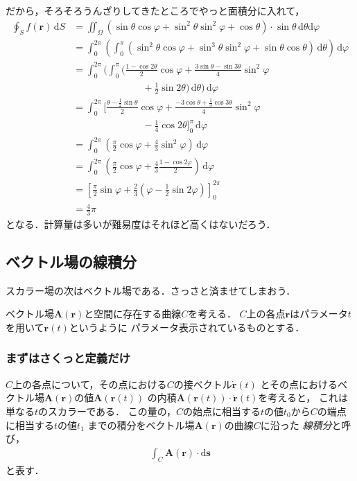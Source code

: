 だから，そろそろうんざりしてきたところでやっと面積分に入れて，
\begin{align*}
\oint_S f( \bm{r} ) \, \mathrm{d} S 
& = \iint _\Omega (\sin \theta \cos \varphi + \sin^2 \theta \sin^2  \varphi 
+ \cos \theta) \cdot \sin \theta \, \mathrm{d}\theta \mathrm{d} \varphi \\
& = \int_0^{2\pi} \left( \int_0^{\pi} ( \sin^2 \theta \cos \varphi + \sin^3 \theta \sin^2 \varphi
+ \sin \theta \cos \theta  
 ) \, \mathrm{d} \theta \right) \, \mathrm{d} \varphi \\
 & = \int_0^{2 \pi} \Biggl( \int_0^{\pi} 
 \Biggl( \frac{1-\cos 2 \theta }{2} \cos \varphi + \frac{ 3 \sin \theta - \sin 3 \theta }{4} \sin^2 \varphi \\
& \hspace{3cm} + \frac{1}{2} \sin 2 \theta \Biggr) \, \mathrm{d} \theta \Biggr) \, \mathrm{d} \varphi \\
& = \int_0^{2 \pi} \biggl[ \frac{\theta - \frac{1}{2} \sin \theta }{2} \cos \varphi 
+ \frac{ - 3 \cos \theta + \frac{1}{3} \cos 3 \theta }{4} \sin ^2 \varphi \\
& \hspace{3cm} - \frac{1}{4} \cos 2 \theta \biggr]_0^{\pi} \, \mathrm{d} \varphi \\
& = \int_0^{2 \pi} \left( \frac{\pi}{2} \cos \varphi + \frac{4}{3} \sin^2 \varphi \right) \, \mathrm{d} \varphi \\
& = \int _0^{2 \pi} \left( \frac{\pi}{2} \cos \varphi 
+ \frac{4}{3} \frac{ 1 -\cos 2 \varphi }{2} \right) \, \mathrm{d} \varphi \\
& = \left[ \frac{\pi}{2} \sin \varphi + \frac{2}{3} \left( \varphi - \frac{1}{2} \sin 2 \varphi \right)
\right] _0^{2 \pi} \\
& = \frac{4}{3}\pi
\end{align*}
となる．計算量は多いが難易度はそれほど高くはないだろう．

\subsection{ベクトル場の線積分}
スカラー場の次はベクトル場である．さっさと済ませてしまおう．

ベクトル場$\bm{A}(\bm{r})$と空間に存在する曲線$C$を考える．
$C$上の各点$\bm{r}$はパラメータ$t$を用いて$\bm{r}(t)$というように
パラメータ表示されているものとする．
\subsubsection{まずはさくっと定義だけ}
$C$上の各点について，その点における$C$の接ベクトル$\dot{ \bm{r} } (t)$
とその点におけるベクトル場$\bm{A}(\bm{r})$の値$\bm{A}(\bm{r}(t))$
の内積$\bm{A}(\bm{r}(t)) \cdot \dot{ \bm{r} } (t)$を考えると，
これは単なる$t$のスカラーである．
この量の，$C$の始点に相当する$t$の値$t_0$から$C$の端点に相当する$t$の値$t_1$
までの積分をベクトル場$\bm{A}(\bm{r})$の曲線$C$に沿った
\emph{線積分}と呼び，
\begin{align*}
\int_C \bm{A}(\bm{r}) \cdot \mathrm{d} \bm{s}
\end{align*}
と表す．

